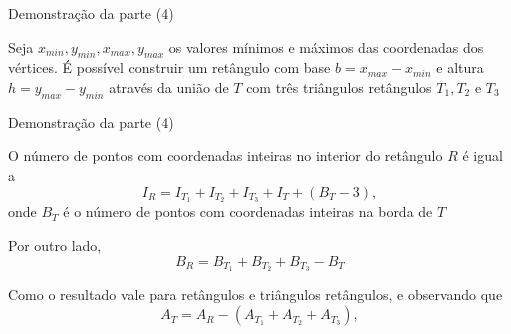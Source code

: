 \begin{frame}[fragile]{Demonstração da parte (4)}

    Seja $x_{min}, y_{min}, x_{max}, y_{max}$ os valores mínimos e máximos das coordenadas dos
        vértices. É possível construir um retângulo com base $b = x_{max} - x_{min}$ e
        altura $h = y_{max} - y_{min}$ através da união de $T$ com três triângulos retângulos
        $T_1, T_2$ e $T_3$
        \pause

    \begin{figure}
        \centering

    \end{figure}

\end{frame}

\begin{frame}[fragile]{Demonstração da parte (4)}

    O número de pontos com coordenadas inteiras no interior do retângulo $R$ é igual a
    \[
        I_R = I_{T_1} + I_{T_2} + I_{T_3} + I_{T} + (B_{T} - 3),
    \]
    onde $B_T$ é o número de pontos com coordenadas inteiras na borda de $T$
        \pause

    Por outro lado,
    \[
        B_R = B_{T_1} + B_{T_2} + B_{T_3} - B_{T}
    \]
        \pause

    Como o resultado vale para retângulos e triângulos retângulos, e observando que
    \[
        A_T = A_R - (A_{T_1} + A_{T_2} + A_{T_3}),
    \]

\end{frame}

